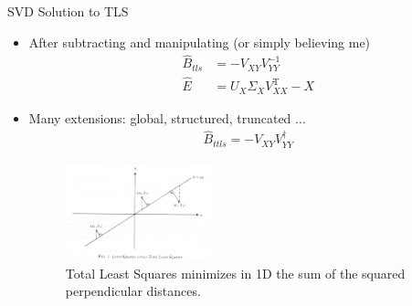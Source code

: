 \documentclass[handout]{beamer}
\begin{document}
\begin{frame}{SVD Solution to TLS}
\begin{itemize}
\item After subtracting and manipulating (or simply believing me)
\begin{equation}
\begin{aligned}
\hat{B}_{tls} &= -V_{XY}V_{YY}^{-1} \\
\hat{E} &= U_X \Sigma_X V_{XX}^{\mathrm{T}} - X
\end{aligned}
\end{equation}
\item Many extensions: global, structured, truncated $\ldots$
\begin{equation}
\begin{aligned}
\hat{B}_{ttls} = -V_{XY}V_{YY}^{\dagger}
\end{aligned}
\end{equation}
\begin{figure}
\centering
\includegraphics[width=0.4\textwidth]{LSvsTLS.jpg}%
\caption{Total Least Squares minimizes in 1D the sum of the squared perpendicular distances.}
\end{figure}
\end{itemize}
\end{frame}
%
\end{document}
